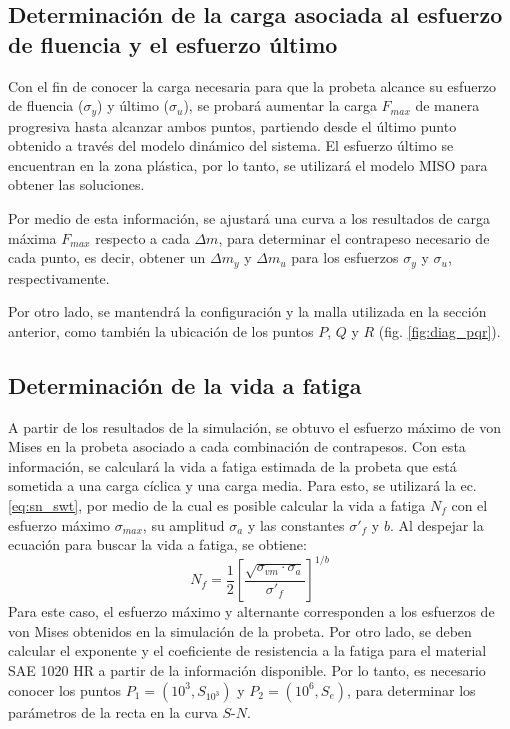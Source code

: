 \newpage 

\subsection{Determinación de la carga asociada al esfuerzo de fluencia y el esfuerzo último}
Con el fin de conocer la carga necesaria para que la probeta alcance su esfuerzo de fluencia ($\sigma_y$) y último ($\sigma_u$), se probará aumentar la carga $F_{max}$ de manera progresiva hasta alcanzar ambos puntos, partiendo desde el último punto obtenido a través del modelo dinámico del sistema. El esfuerzo último se encuentran en la zona plástica, por lo tanto, se utilizará el modelo MISO para obtener las soluciones.

Por medio de esta información, se ajustará una curva a los resultados de carga máxima $F_{max}$ respecto a cada $\Delta m$, para determinar el contrapeso necesario de cada punto, es decir, obtener un $\Delta m_y$ y $\Delta m_u$ para los esfuerzos $\sigma_y$ y $\sigma_u$, respectivamente.

Por otro lado, se mantendrá la configuración y la malla utilizada en la sección anterior, como también la ubicación de los puntos $P$, $Q$ y $R$ (fig. \ref{fig:diag_pqr}).

\subsection{Determinación de la vida a fatiga}

A partir de los resultados de la simulación, se obtuvo el esfuerzo máximo de von Mises en la probeta asociado a cada combinación de contrapesos. Con esta información, se calculará la vida a fatiga estimada de la probeta que está sometida a una carga cíclica y una carga media. Para esto, se utilizará la ec. \ref{eq:sn_swt}, por medio de la cual es posible calcular la vida a fatiga $N_f$ con el esfuerzo máximo $\sigma_{max}$, su amplitud $\sigma_a$ y las constantes $\sigma'_f$ y $b$. Al despejar la ecuación para buscar la vida a fatiga, se obtiene:
\bigskip
\begin{equation} \label{eq:nf_swt}
	N_f  = \frac{1}{2} \left[\frac{\sqrt{\sigma_{vm}\cdot \sigma_a}}{\sigma'_f} \right]^{1/b}	
\end{equation}
Para este caso, el esfuerzo máximo y alternante corresponden a los esfuerzos de von Mises obtenidos en la simulación de la probeta. Por otro lado, se deben calcular el exponente y el coeficiente de resistencia a la fatiga para el material SAE 1020 HR a partir de la información disponible. Por lo tanto, es necesario conocer los puntos $P_1 = (10^3,S_{10^3})$ y $P_2 = (10^6,S_e)$, para determinar los parámetros de la recta en la curva $S$-$N$.

